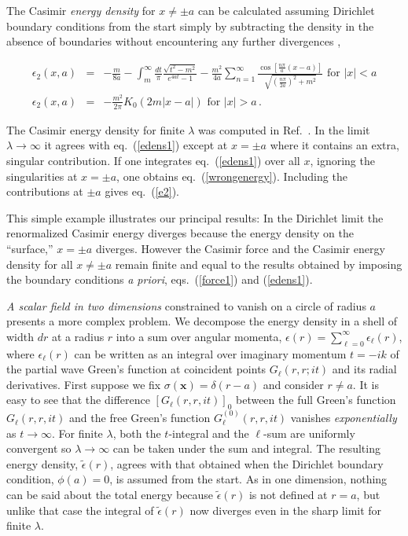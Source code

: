\documentclass[a4paper,aps,amsfonts,prl,showpacs,nobibnotes,nofootinbib,%
tightenlines,twocolumn]{revtex4}
\newcommand{\vek}[1]{\mathbf{#1}}
\begin{document}
The Casimir \emph{energy density} for $x\ne\pm a$ can be calculated
assuming Dirichlet boundary conditions from the start simply
by subtracting the density in the absence of boundaries without
encountering any further divergences \cite{MT},
%
\begin{widetext}\vspace*{-\bigskipamount}
\begin{eqnarray}
\epsilon_{2}(x,a) & = &
-\frac{m}{8a}- \int_{m}^{\infty}\frac{dt}{\pi}
\frac{\sqrt{t^2-m^2}}{e^{4at}
-1} -\frac{m^2}{4a}\sum_{n=1}^{\infty}\frac{\cos
\left[\frac{n\pi}{a}(x-a)\right]}{\sqrt{(\frac{n\pi}{2a})^2+m^2}}
\mbox{ for } |x|<a \nonumber \\
\epsilon_{2}(x,a) & = & -\frac{m^2}{2\pi}K_0(2m|x-a|) \mbox{  for  } 
|x|>a \,.
\label{edens1}
\end{eqnarray}
\end{widetext}
%
The Casimir energy density for finite $\lambda$ was computed in
Ref.~\cite{dens}.  In the limit $\lambda\to\infty$ it agrees with
eq.~(\ref{edens1}) except at $x=\pm a$ where it contains an extra,
singular contribution.  If one integrates eq.~(\ref{edens1}) over all
$x$, ignoring the singularities at $x=\pm a$, one obtains
eq.~(\ref{wrongenergy}).  Including the contributions at $\pm a$ gives
eq.~(\ref{e2}).

This simple example illustrates our principal results: In the
Dirichlet limit the renormalized Casimir energy diverges because the
energy density on the ``surface,'' $x =\pm a$ diverges.  However the
Casimir force and the Casimir energy density for all $x\neq\pm a$
remain finite and equal to the results obtained by imposing the
boundary conditions {\it a priori\/}, eqs.~(\ref{force1}) and
(\ref{edens1}).

\emph{A scalar field in two dimensions} constrained to vanish on a circle of
radius $a$ presents a more complex problem. We decompose the energy
density in a shell of width $dr$ at a radius $r$ into a sum over angular
momenta, $\epsilon(r)= \sum_{\ell=0}^{\infty}
\epsilon_{\ell}(r)$, where $\epsilon_{\ell}(r)$ can
be written as an integral over imaginary momentum $t=-ik$
of the partial wave Green's function at coincident
points $G_{\ell}(r,r;it)$ and its radial derivatives.  First
suppose we fix $\sigma(\vek x)=\delta(r-a)$ and consider $r\ne a$.  It
is easy to see that the difference $[G_{\ell}(r,r,it)]_0$ 
between the full Green's function $G_{\ell}(r,r,it)$ and the free
Green's function $G_{\ell}^{(0)}(r,r,it)$ vanishes \emph{exponentially}
as $t\to\infty$.  For finite $\lambda$, both the $t$-integral and the
$\ell$-sum are uniformly  convergent so $\lambda\to\infty$ can be
taken under the sum and integral.  The resulting energy density,
$\tilde\epsilon(r)$, agrees with that obtained when the Dirichlet
boundary condition, $\phi(a)=0$, is assumed from the start.  As in one
dimension, nothing can be said about the total energy because
$\tilde\epsilon(r)$ is not defined at $r=a$, but unlike that case  the
integral of $\tilde\epsilon(r)$ now diverges even in the sharp limit for
finite $\lambda$.
\end{document}
